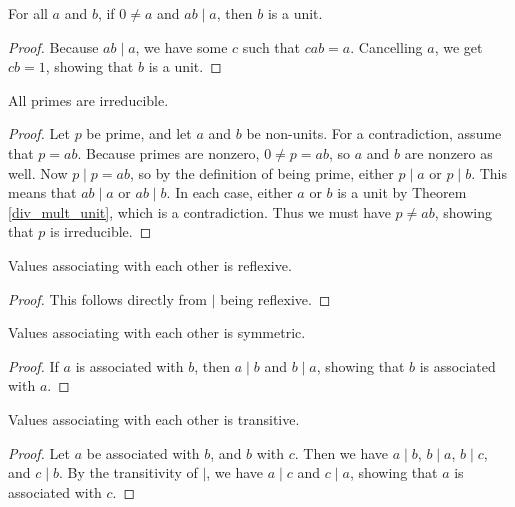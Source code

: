 \documentclass[../../math.tex]{subfiles}
\begin{document}
\begin{theorem} \label{div_mult_unit}
    For all $a$ and $b$, if $0 \neq a$ and $ab \mid a$, then $b$ is a unit.
\end{theorem}
\begin{proof}
    Because $ab \mid a$, we have some $c$ such that $cab = a$.  Cancelling $a$,
    we get $cb = 1$, showing that $b$ is a unit.
\end{proof}

\begin{theorem} \label{prime_irreducible}
    All primes are irreducible.
\end{theorem}
\begin{proof}
    Let $p$ be prime, and let $a$ and $b$ be non-units.  For a contradiction,
    assume that $p = ab$.  Because primes are nonzero, $0 \neq p = ab$, so $a$
    and $b$ are nonzero as well.  Now $p \mid p = ab$, so by the definition of
    being prime, either $p \mid a$ or $p \mid b$.  This means that $ab \mid a$
    or $ab \mid b$.  In each case, either $a$ or $b$ is a unit by Theorem
    \ref{div_mult_unit}, which is a contradiction.  Thus we must have $p \neq
    ab$, showing that $p$ is irreducible.
\end{proof}

\begin{instance}
    Values associating with each other is reflexive.
\end{instance}
\begin{proof}
    This follows directly from $\mid$ being reflexive.
\end{proof}

\begin{instance}
    Values associating with each other is symmetric.
\end{instance}
\begin{proof}
    If $a$ is associated with $b$, then $a \mid b$ and $b \mid a$, showing that
    $b$ is associated with $a$.
\end{proof}

\begin{instance}
    Values associating with each other is transitive.
\end{instance}
\begin{proof}
    Let $a$ be associated with $b$, and $b$ with $c$.  Then we have $a \mid b$,
    $b \mid a$, $b \mid c$, and $c \mid b$.  By the transitivity of $\mid$, we
    have $a \mid c$ and $c \mid a$, showing that $a$ is associated with $c$.
\end{proof}
\end{document}
